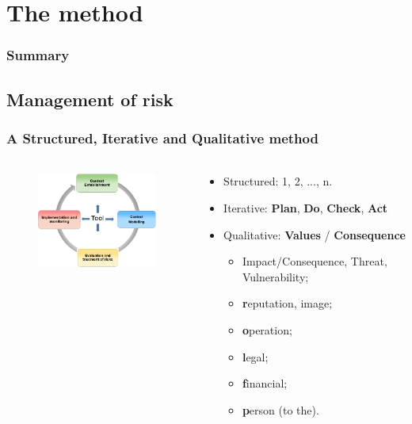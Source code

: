 
%
%
\section{The method}
\begin{frame}
    \frametitle{Summary}
\end{frame}


\subsection{Management of risk}
\begin{frame}
    \frametitle{A Structured, Iterative and Qualitative method}
    \framesubtitle{}
    \begin{columns}[t]
        \begin{column}{5.5cm}
            \begin{figure}
            \includegraphics[width=5.5cm]{../common_pictures/MONARC-method-1.png}
            \end{figure}
        \end{column}
        \begin{column}{6.5cm}
            \begin{itemize}
                \item Structured: 1, 2, ..., n.
                \item Iterative: \textbf{Plan}, \textbf{Do}, \textbf{Check}, \textbf{Act}
                \item Qualitative: \textbf{Values} / \textbf{Consequence}
                \begin{itemize}
                    \item Impact/Consequence, Threat, Vulnerability;
                    \item \textbf{r}eputation, image;
                    \item \textbf{o}peration;
                    \item \textbf{l}egal;
                    \item \textbf{f}inancial;
                    \item \textbf{p}erson (to the).
                \end{itemize}
            \end{itemize}
        \end{column}
    \end{columns}
\end{frame}

